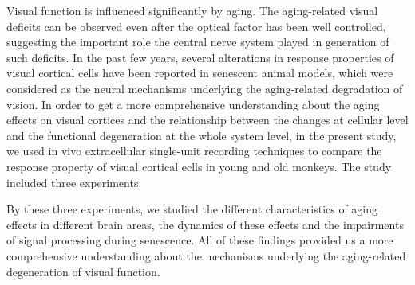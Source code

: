 \begin{enabstract}
Visual function is influenced significantly by aging. The aging-related visual deficits can be observed even after the optical factor has been well controlled, suggesting the important role the central nerve system played in generation of such deficits. In the past few years, several alterations in response properties of visual cortical cells have been reported in senescent animal models, which were considered as the neural mechanisms underlying the aging-related degradation of vision. In order to get a more comprehensive understanding about the aging effects on visual cortices and the relationship between the changes at cellular level and the functional degeneration at the whole system level, in the present study, we used in vivo extracellular single-unit recording techniques to compare the response property of visual cortical eclls in young and old monkeys. The study included three experiments:

By these three experiments, we studied the different characteristics of aging effects in different brain areas, the dynamics of these effects and the impairments of signal processing during senescence. All of these findings provided us a more comprehensive understanding about the mechanisms underlying the aging-related degeneration of visual function.


\end{enabstract}
